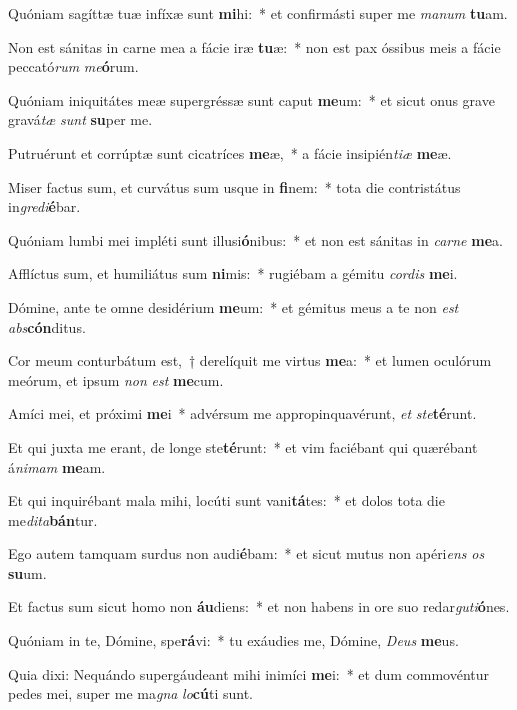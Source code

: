 \item Quóniam sagíttæ tuæ infíxæ sunt \textbf{mi}hi:~* et confirmásti super me \textit{manum} \textbf{tu}am.
\item Non est sánitas in carne mea a fácie iræ \textbf{tu}æ:~* non est pax óssibus meis a fácie peccató\textit{rum} \textit{me}\textbf{ó}rum.
\item Quóniam iniquitátes meæ supergréssæ sunt caput \textbf{me}um:~* et sicut onus grave gravá\tinyhspace\textit{tæ} \textit{sunt} \textbf{su}per me.
\item Putruérunt et corrúptæ sunt cicatríces \textbf{me}æ,~* a fácie insipién\textit{tiæ} \textbf{me}æ.
\item Miser factus sum, et curvátus sum usque in \textbf{fi}nem:~* tota die contristátus in\textit{gredi}\textbf{é}bar.
\item Quóniam lumbi mei impléti sunt illusi\textbf{ó}nibus:~* et non est sánitas in \textit{carne} \textbf{me}a.
\item Afflíctus sum, et humiliátus sum \textbf{ni}mis:~* rugiébam a gémitu \textit{cordis} \textbf{me}i.
\item Dómine, ante te omne desidérium \textbf{me}um:~* et gémitus meus a te non \textit{est} \textit{abs}\textbf{cón}ditus.
\item Cor meum conturbátum est,~† derelíquit me virtus \textbf{me}a:~* et lumen oculórum meórum, et ipsum \textit{non} \textit{est} \textbf{me}cum.
\item Amíci mei, et próximi \textbf{me}i~* advérsum me appropinquavérunt, \textit{et} \textit{ste}\textbf{té}runt.
\item Et qui juxta me erant, de longe ste\textbf{té}runt:~* et vim faciébant qui quærébant á\tinyhspace\textit{nimam} \textbf{me}am.
\item Et qui inquirébant mala mihi, locúti sunt vani\textbf{tá}tes:~* et dolos tota die me\spurhspace\textit{dita}\textbf{bán}tur.
\item Ego autem tamquam surdus non audi\textbf{é}bam:~* et sicut mutus non apéri\tinyhspace\textit{ens} \textit{os} \textbf{su}um.
\item Et factus sum sicut homo non \textbf{áu}diens:~* et non habens in ore suo redar\textit{guti}\textbf{ó}nes.
\item Quóniam in te, Dómine, spe\textbf{rá}vi:~* tu exáudies me, Dómine, \textit{Deus} \textbf{me}us.
\item Quia dixi: Nequándo supergáudeant mihi inimíci \textbf{me}i:~* et dum commovéntur pedes mei, super me ma\textit{gna} \textit{lo}\textbf{cú}ti sunt.
